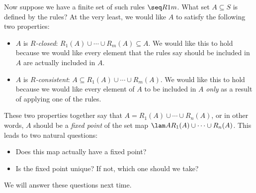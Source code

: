 Now suppose we have a finite set of such rules $\seq R1m$. What set $A\subseteq S$ is defined by the rules? At the very least, we would like $A$ to satisfy the following two properties:
\begin{itemize}
\item
$A$ is \emph{$R$-closed}: $R_1(A)\cup\cdots\cup R_m(A)\subseteq A$. We would like this to hold because we would like every element that the rules say should be included in $A$ are actually included in $A$.
\item
$A$ is \emph{$R$-consistent}: $A\subseteq R_1(A)\cup\cdots\cup R_m(A)$. We would like this to hold because we would like every element of $A$ to be included in $A$ \emph{only} as a result of applying one of the rules.
\end{itemize}
These two properties together say that $A=R_1(A)\cup\cdots\cup R_n(A)$, or in other words, $A$ should be a \emph{fixed point} of the set map
$\lam A{R_1(A)\cup\cdots\cup R_n(A)}$. This leads to two natural questions:
\begin{itemize}
\item
Does this map actually have a fixed point?
\item
Is the fixed point unique? If not, which one should we take?
\end{itemize}

We will answer these questions next time.

